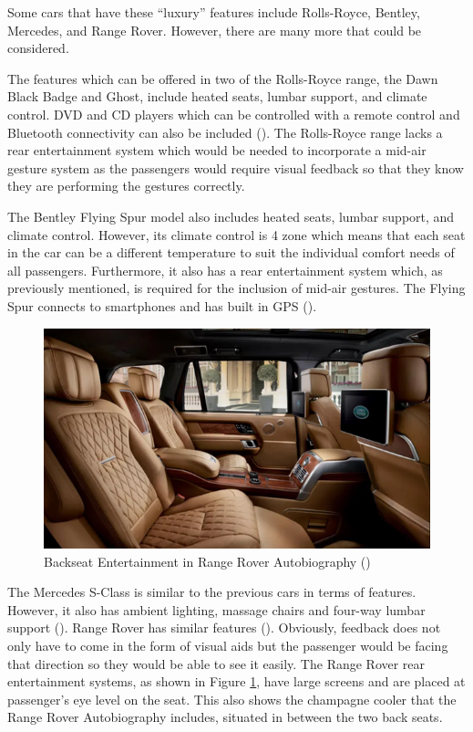 \documentclass{l4proj}
\begin{document}
Some cars that have these “luxury” features include Rolls-Royce, Bentley, Mercedes, and Range Rover. However, there are many more that could be considered.

The features which can be offered in two of the Rolls-Royce range, the Dawn Black Badge and Ghost, include heated seats, lumbar support, and climate control. DVD and CD players which can be controlled with a remote control and Bluetooth connectivity can also be included (\cite{CarDekho_2020}). The Rolls-Royce range lacks a rear entertainment system which would be needed to incorporate a mid-air gesture system as the passengers would require visual feedback so that they know they are performing the gestures correctly.

The Bentley Flying Spur model also includes heated seats, lumbar support, and climate control. However, its climate control is 4 zone which means that each seat in the car can be a different temperature to suit the individual comfort needs of all passengers.  Furthermore, it also has a rear entertainment system which, as previously mentioned, is required for the inclusion of mid-air gestures. The Flying Spur connects to smartphones and has built in GPS (\cite{Bentley_2021}).

\begin{figure}[!htb]
    \centering
    \includegraphics[scale = 0.5]{images/rangeRoverInterior.png}
    \caption{Backseat Entertainment in Range Rover Autobiography (\cite{Finnerty_2017})}
    \label{fig:rangeRoverInterior}
\end{figure}

The Mercedes S-Class is similar to the previous cars in terms of features. However, it also has ambient lighting, massage chairs and four-way lumbar support (\cite{Mercedes}). Range Rover has similar features (\cite{Range_Rover}). Obviously, feedback does not only have to come in the form of visual aids but the passenger would be facing that direction so they would be able to see it easily. The Range Rover rear entertainment systems, as shown in Figure \ref{fig:rangeRoverInterior}, have large screens and are placed at passenger's eye level on the seat. This also shows the champagne cooler that the Range Rover Autobiography includes, situated in between the two back seats.
\end{document}
